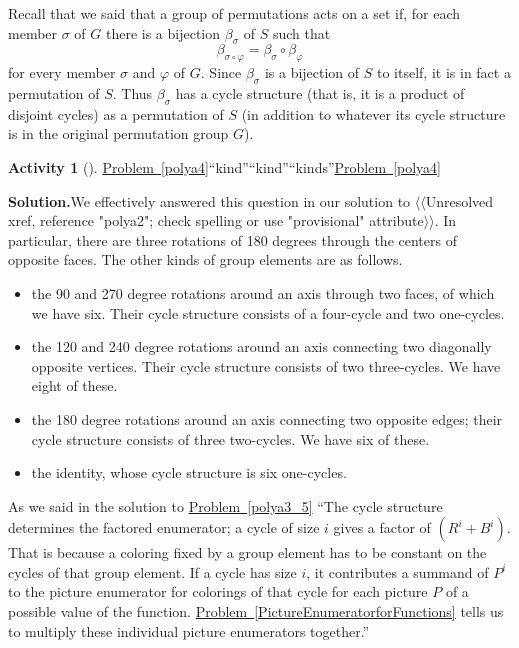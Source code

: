 \documentclass[10pt,]{book}
\theoremstyle{plain}
\theoremstyle{definition}
\newtheorem{activity}[project]{Activity}
\numberwithin{equation}{chapter}
\begin{document}
Recall that we said that a group of permutations acts on a set if, for each member \(\sigma\) of \(G\) there is a bijection \(\beta_{\sigma}\) of \(S\) such that%
\begin{equation*}
\beta_{\sigma\circ\varphi} = \beta_{\sigma}\circ\beta_{\varphi}
\end{equation*}
for every member \(\sigma\) and \(\varphi\) of \(G\). Since \(\beta_{\sigma}\) is a bijection of \(S\) to itself, it is in fact a permutation of \(S\). Thus \(\beta_{\sigma}\) has a cycle structure (that is, it is a product of disjoint cycles) as a permutation of \(S\) (in addition to whatever its cycle structure is in the original permutation group \(G\)).%
\begin{activity}[]\label{activity-311}
\hyperref[polya4]{Problem~\ref{polya4}}``kind''``kind''``kinds''\hyperref[polya4]{Problem~\ref{polya4}}\par\medskip\noindent%
\textbf{Solution.}\quad We effectively answered this question in our solution to {$\langle\langle$Unresolved xref, reference "polya2"; check spelling or use "provisional" attribute$\rangle\rangle$}. In particular, there are three rotations of 180 degrees through the centers of opposite faces. The other kinds of group elements are as follows.%
\leavevmode%
\begin{itemize}[label=\textbullet]
\item{}the 90 and 270 degree rotations around an axis through two faces, of which we have six.  Their cycle structure consists of a four-cycle and two one-cycles.%
\item{}the 120 and 240 degree rotations around an axis connecting two diagonally opposite vertices.  Their cycle structure consists of two three-cycles.  We have eight of these.%
\item{}the 180 degree rotations around an axis connecting two opposite edges; their cycle structure consists of three two-cycles.  We have six of these.%
\item{}the identity, whose cycle structure is six one-cycles.%
\end{itemize}
As we said in the solution to \hyperref[polya3_5]{Problem~\ref{polya3_5}} ``The cycle structure determines the factored enumerator; a cycle of size \(i\) gives a factor of \((R^i+B^i)\). That is because a coloring fixed by a group element has to be constant on the cycles of that group element. If a cycle has size \(i\), it contributes a summand of \(P^i\) to the picture enumerator for colorings of that cycle for each picture \(P\) of a possible value of the function. \hyperref[PictureEnumeratorforFunctions]{Problem~\ref{PictureEnumeratorforFunctions}} tells us to multiply these individual picture enumerators together.''%
\end{activity}
\end{document}
